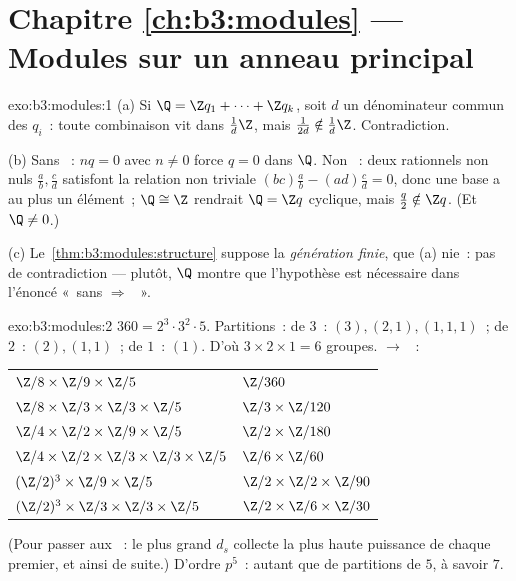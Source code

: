 \section*{Chapitre \ref{ch:b3:modules} --- Modules sur un anneau
principal}

\begin{solution}{exo:b3:modules:1}
(a) Si $\Q = \Z q_1 + \dots + \Z q_k$, soit $d$ un dénominateur
commun des $q_i$~: toute combinaison vit dans $\frac1d\Z$, mais
$\frac1{2d} \notin \frac1d\Z$. Contradiction.

(b) Sans ~: $nq = 0$ avec $n \neq 0$ force $q = 0$ dans
$\Q$. Non ~: deux rationnels non nuls $\frac ab, \frac cd$
satisfont la relation non triviale $(bc)\frac ab - (ad)\frac cd =
0$, donc une base a au plus un élément~; $\Q \cong \Z$ rendrait
$\Q = \Z q$ cyclique, mais $\frac q2 \notin \Z q$. (Et $\Q \neq
0$.)

(c) Le~\cref{thm:b3:modules:structure} suppose la \emph{génération
finie}, que (a) nie~: pas de contradiction --- plutôt, $\Q$
montre que l'hypothèse est nécessaire dans l'énoncé «~sans 
$\Rightarrow$ ~».
\end{solution}

\begin{solution}{exo:b3:modules:2}
$360 = 2^3\cdot3^2\cdot5$. Partitions~: de $3$~: $(3), (2,1),
(1,1,1)$~; de $2$~: $(2), (1,1)$~; de $1$~: $(1)$. D'où $3 \times
2 \times 1 = 6$ groupes.  $\to$ ~:
\begin{center}
\begin{tabular}{l l}
$\Z/8 \times \Z/9 \times \Z/5$ & $\Z/360$\\
$\Z/8 \times \Z/3 \times \Z/3 \times \Z/5$ & $\Z/3 \times
\Z/120$\\
$\Z/4 \times \Z/2 \times \Z/9 \times \Z/5$ & $\Z/2 \times
\Z/180$\\
$\Z/4 \times \Z/2 \times \Z/3 \times \Z/3 \times \Z/5$ & $\Z/6
\times \Z/60$\\
$(\Z/2)^3 \times \Z/9 \times \Z/5$ & $\Z/2 \times \Z/2 \times
\Z/90$\\
$(\Z/2)^3 \times \Z/3 \times \Z/3 \times \Z/5$ & $\Z/2 \times
\Z/6 \times \Z/30$
\end{tabular}
\end{center}
(Pour passer aux ~: le plus grand $d_s$
collecte la plus haute puissance de chaque premier, et ainsi de
suite.) D'ordre $p^5$~: autant que de partitions de $5$, à savoir
$7$.
\end{solution}

